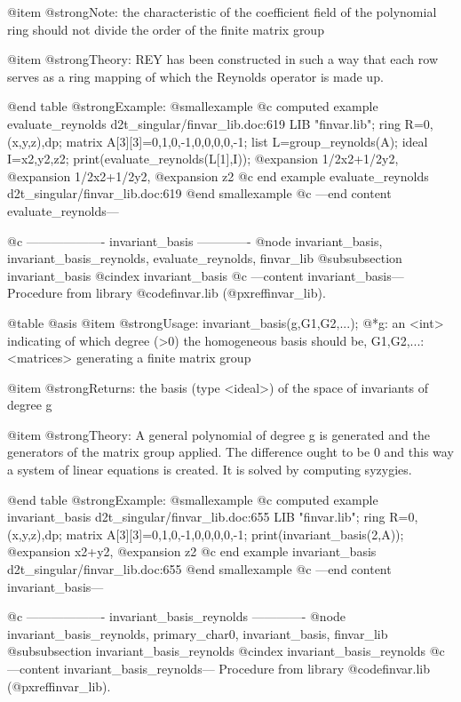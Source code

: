 @item @strong{Note:}
the characteristic of the coefficient field of the polynomial ring
should not divide the order of the finite matrix group

@item @strong{Theory:}
REY has been constructed in such a way that each row serves as a ring
mapping of which the Reynolds operator is made up.

@end table
@strong{Example:}
@smallexample
@c computed example evaluate_reynolds d2t_singular/finvar_lib.doc:619 
LIB "finvar.lib";
ring R=0,(x,y,z),dp;
matrix A[3][3]=0,1,0,-1,0,0,0,0,-1;
list L=group_reynolds(A);
ideal I=x2,y2,z2;
print(evaluate_reynolds(L[1],I));
@expansion{} 1/2x2+1/2y2,
@expansion{} 1/2x2+1/2y2,
@expansion{} z2
@c end example evaluate_reynolds d2t_singular/finvar_lib.doc:619
@end smallexample
@c ---end content evaluate_reynolds---

@c ------------------- invariant_basis -------------
@node invariant_basis, invariant_basis_reynolds, evaluate_reynolds, finvar_lib
@subsubsection invariant_basis
@cindex invariant_basis
@c ---content invariant_basis---
Procedure from library @code{finvar.lib} (@pxref{finvar_lib}).

@table @asis
@item @strong{Usage:}
invariant_basis(g,G1,G2,...);
@*g: an <int> indicating of which degree (>0) the homogeneous basis
should be, G1,G2,...: <matrices> generating a finite matrix group

@item @strong{Returns:}
the basis (type <ideal>) of the space of invariants of degree g

@item @strong{Theory:}
A general polynomial of degree g is generated and the generators of
the matrix group applied. The difference ought to be 0 and this way a
system of linear equations is created. It is solved by computing
syzygies.

@end table
@strong{Example:}
@smallexample
@c computed example invariant_basis d2t_singular/finvar_lib.doc:655 
LIB "finvar.lib";
ring R=0,(x,y,z),dp;
matrix A[3][3]=0,1,0,-1,0,0,0,0,-1;
print(invariant_basis(2,A));
@expansion{} x2+y2,
@expansion{} z2
@c end example invariant_basis d2t_singular/finvar_lib.doc:655
@end smallexample
@c ---end content invariant_basis---

@c ------------------- invariant_basis_reynolds -------------
@node invariant_basis_reynolds, primary_char0, invariant_basis, finvar_lib
@subsubsection invariant_basis_reynolds
@cindex invariant_basis_reynolds
@c ---content invariant_basis_reynolds---
Procedure from library @code{finvar.lib} (@pxref{finvar_lib}).

